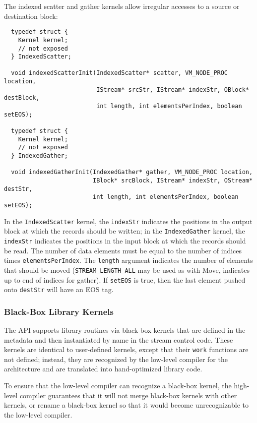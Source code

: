 The indexed scatter and gather kernels allow irregular accesses to a
source or destination block:

{\small \begin{verbatim}
  typedef struct {
    Kernel kernel;
    // not exposed
  } IndexedScatter;

  void indexedScatterInit(IndexedScatter* scatter, VM_NODE_PROC location,
                          IStream* srcStr, IStream* indexStr, OBlock* destBlock, 
                          int length, int elementsPerIndex, boolean setEOS);
                     
  typedef struct {
    Kernel kernel;
    // not exposed
  } IndexedGather;

  void indexedGatherInit(IndexedGather* gather, VM_NODE_PROC location, 
                         IBlock* srcBlock, IStream* indexStr, OStream* destStr, 
                         int length, int elementsPerIndex, boolean setEOS);
\end{verbatim}}

In the {\tt IndexedScatter} kernel, the {\tt indexStr} indicates the
positions in the output block at which the records should be written;
in the {\tt IndexedGather} kernel, the {\tt indexStr} indicates the
positions in the input block at which the records should be read. The
number of data elements must be equal to the number of indices times
{\tt elementsPerIndex}. The {\tt length} argument indicates the number
of elements that should be moved ({\tt STREAM\_LENGTH\_ALL} may be
used as with Move, indicates up to end of indices for gather).  If
{\tt setEOS} is true, then the last element pushed onto {\tt destStr}
will have an EOS tag.

\subsubsection{Black-Box Library Kernels}
\label{sec:kernelllc}

The API supports library routines via black-box kernels that are
defined in the metadata and then instantiated by name in the stream
control code.  These kernels are identical to user-defined kernels,
except that their {\tt work} functions are not defined; instead, they
are recognized by the low-level compiler for the architecture and are
translated into hand-optimized library code.

To ensure that the low-level compiler can recognize a black-box
kernel, the high-level compiler guarantees that it will not merge
black-box kernels with other kernels, or rename a black-box kernel so
that it would become unrecognizable to the low-level compiler.

